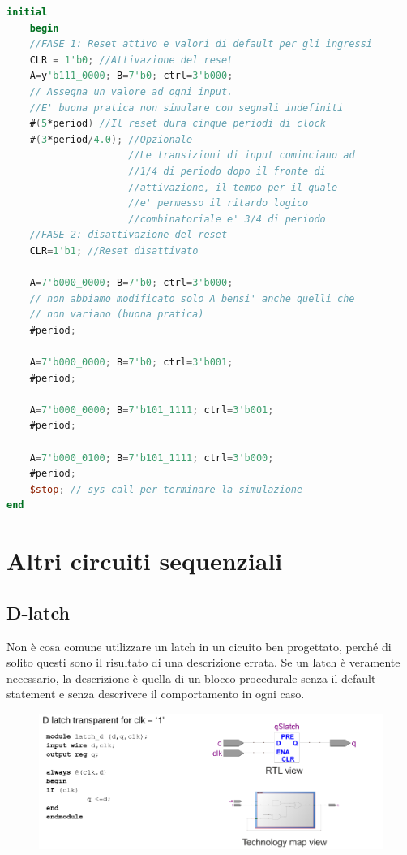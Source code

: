 \documentclass{book}
\begin{document}
        \begin{lstlisting}[language=Verilog]
initial
    begin
    //FASE 1: Reset attivo e valori di default per gli ingressi
    CLR = 1'b0; //Attivazione del reset
    A=y'b111_0000; B=7'b0; ctrl=3'b000; 
    // Assegna un valore ad ogni input. 
    //E' buona pratica non simulare con segnali indefiniti
    #(5*period) //Il reset dura cinque periodi di clock
    #(3*period/4.0); //Opzionale
                     //Le transizioni di input cominciano ad
                     //1/4 di periodo dopo il fronte di 
                     //attivazione, il tempo per il quale
                     //e' permesso il ritardo logico 
                     //combinatoriale e' 3/4 di periodo
    //FASE 2: disattivazione del reset
    CLR=1'b1; //Reset disattivato

    A=7'b000_0000; B=7'b0; ctrl=3'b000; 
    // non abbiamo modificato solo A bensi' anche quelli che 
    // non variano (buona pratica)
    #period;

    A=7'b000_0000; B=7'b0; ctrl=3'b001;
    #period;

    A=7'b000_0000; B=7'b101_1111; ctrl=3'b001;
    #period;

    A=7'b000_0100; B=7'b101_1111; ctrl=3'b000;
    #period;
    $stop; // sys-call per terminare la simulazione
end
        \end{lstlisting}
        \newpage
        \section{Altri circuiti sequenziali}
        \subsection{D-latch}
        Non è cosa comune utilizzare un latch in un cicuito ben progettato, perché di solito
        questi sono il risultato di una descrizione errata. Se un latch è veramente necessario,
        la descrizione è quella di un blocco procedurale senza il default statement e senza descrivere
        il comportamento in ogni caso. 
        \begin{figure}[h!]
            \center
            \includegraphics[width=0.75\linewidth]{img/chapt11img10.png}
        \end{figure}
\end{document}

